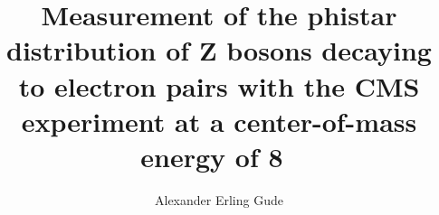 \phd %

\title{
    \textbf{
        Measurement of the phistar distribution of Z bosons decaying to
        electron pairs with the CMS experiment at a center-of-mass energy of
        8~\TeV
    }
}
\author{Alexander Erling Gude}


\abstract{}
\copyrightpage
\acknowledgements{}
\dedication{}

\beforepreface

\figurespage
\tablespage

\afterpreface
